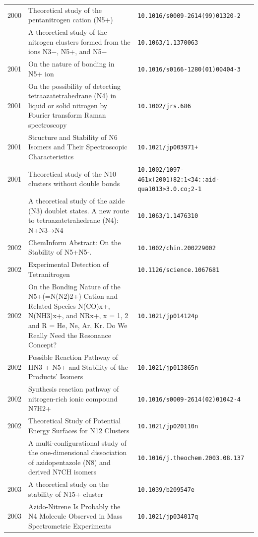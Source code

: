 \begin{longtable}{@{}p{1.0cm}p{10.5cm}p{3.5cm}@{}}
2000 & Theoretical study of the pentanitrogen cation (N5+) & \small\texttt{10.1016/s0009-2614(99)01320-2} \\
\addlinespace
2001 & A theoretical study of the nitrogen clusters formed from the ions N3−, N5+, and N5− & \small\texttt{10.1063/1.1370063} \\
2001 & On the nature of bonding in N5+ ion & \small\texttt{10.1016/s0166-1280(01)00404-3} \\
2001 & On the possibility of detecting tetraazatetrahedrane (N4) in liquid or solid nitrogen by Fourier transform Raman spectroscopy & \small\texttt{10.1002/jrs.686} \\
2001 & Structure and Stability of N6 Isomers and Their Spectroscopic Characteristics & \small\texttt{10.1021/jp003971+} \\
2001 & Theoretical study of the N10 clusters without double bonds & \small\texttt{10.1002/1097-461x(2001)82:1<34::aid-qua1013>3.0.co;2-1} \\
\addlinespace
2002 & A theoretical study of the azide (N3) doublet states. A new route to tetraazatetrahedrane (N4): N+N3→N4 & \small\texttt{10.1063/1.1476310} \\
2002 & ChemInform Abstract: On the Stability of N5+N5‐. & \small\texttt{10.1002/chin.200229002} \\
2002 & Experimental Detection of Tetranitrogen & \small\texttt{10.1126/science.1067681} \\
2002 & On the Bonding Nature of the N5+(=N(N2)2+) Cation and Related Species N(CO)x+, N(NH3)x+, and NRx+, x = 1, 2 and R = He, Ne, Ar, Kr. Do We Really Need the Resonance Concept? & \small\texttt{10.1021/jp014124p} \\
2002 & Possible Reaction Pathway of HN3 + N5+ and Stability of the Products' Isomers & \small\texttt{10.1021/jp013865n} \\
2002 & Synthesis reaction pathway of nitrogen-rich ionic compound N7H2+ & \small\texttt{10.1016/s0009-2614(02)01042-4} \\
2002 & Theoretical Study of Potential Energy Surfaces for N12 Clusters & \small\texttt{10.1021/jp020110n} \\
\addlinespace
2003 & A multi-configurational study of the one-dimensional dissociation of azidopentazole (N8) and derived N7CH isomers & \small\texttt{10.1016/j.theochem.2003.08.137} \\
2003 & A theoretical study on the stability of N15+ cluster & \small\texttt{10.1039/b209547e} \\
2003 & Azido-Nitrene Is Probably the N4 Molecule Observed in Mass Spectrometric Experiments & \small\texttt{10.1021/jp034017q} \\

\end{longtable}
